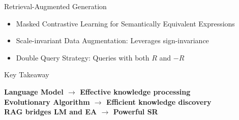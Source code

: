 \documentclass[final]{beamer}
\newcommand{\hlmodern}[1]{\textcolor{modernhighlight}{#1}}
\newlength{\sepwid}
\newlength{\onecolwid}
\begin{document}
\begin{frame}[t]
\begin{columns}[t]
\begin{column}{\onecolwid}
\begin{block}{Retrieval-Augmented Generation}
                    \begin{itemize}
                        \item Masked Contrastive Learning for Semantically Equivalent Expressions
                        \item Scale-invariant Data Augmentation: Leverages sign-invariance
                        \item Double Query Strategy: Queries with both $R$ and $-R$
                    \end{itemize}
                \end{block}
                \vspace{-0.3cm}
                \begin{alertblock}{Key Takeaway}
                    \begin{center}
                        \textbf{\hlmodern{Language Model} $\rightarrow$ \hlmodern{Effective knowledge processing}}\\
                        \textbf{\hlmodern{Evolutionary Algorithm} $\rightarrow$ \hlmodern{Efficient knowledge discovery}}\\
                        \textbf{\hlmodern{RAG bridges LM and EA} $\rightarrow$ \hlmodern{Powerful SR}}
                    \end{center}
                \end{alertblock}
            \end{column} %

            \begin{column}{\sepwid}\end{column} %

            \begin{column}{\onecolwid} %




\end{column}
\end{columns}
\end{frame}
\end{document}
